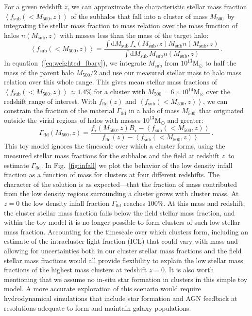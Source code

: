 \documentclass[useAMS,usenatbib,iop,numberedappendix]{mn2e}
\newcommand{\Msun}{\ensuremath{\mathrm{M}_{\odot}}}
\newcommand{\Mfiveoo}{\ensuremath{M_{500}}}
\newcommand{\Mfiveoosub}{\ensuremath{M_{\mathrm{sub}}}}
\newcommand{\redshift}{\ensuremath{z}}
\newcommand{\dif}{\ensuremath{\mathrm{d}}}
\newcommand{\Bstar}{\ensuremath{B_{\star}}}
\newcommand{\fstar}{\ensuremath{f_{\star}}}
\newcommand{\percent}{\ensuremath{\%}}
\begin{document}
For a given redshift \redshift, we can approximate the characteristic stellar mass fraction $\left<f_\mathrm{sub}(<\Mfiveoo,\redshift)\right>$ of the subhalos that fall into a cluster of mass \Mfiveoo\ by integrating the stellar mass fraction to mass relation over the mass function of halos $n({\Mfiveoosub}, \redshift)$ with masses less than the mass of the target halo:
%
\begin{equation}
\label{eq:weighted_fbary}
\left<f_\mathrm{sub}(<\Mfiveoo,\redshift)\right> = \frac{ 
\int\dif {\Mfiveoosub}\, \fstar({\Mfiveoosub}, \redshift) \Mfiveoosub n({\Mfiveoosub}, \redshift) 
}{
\int \dif {\Mfiveoosub}\, \Mfiveoosub n({\Mfiveoosub}, \redshift) 
} \,  .
\end{equation}
%
In equation~(\ref{eq:weighted_fbary}), we integrate ${\Mfiveoosub}$ from $10^{13}\Msun$
to half the mass of the parent halo $\Mfiveoo/2$ and use our measured stellar mass to halo mass relation over this whole range.  This gives mean stellar mass fractions of 
$\left<f_\mathrm{sub}(<\Mfiveoo,\redshift)\right>\approx1.4\percent$ for a cluster with $\Mfiveoo=6\times10^{14}\Msun$ over the redshift range of interest.
With $f_{\mathrm{fld}}(\redshift)$ and $\left<f_\mathrm{sub}(<\Mfiveoo,\redshift)\right>$, we can constrain the fraction of the material  $\Gamma_\mathrm{fld}$ in a halo of mass \Mfiveoo\ that originated outside the virial regions of halos with masses $10^{13}\Msun$ and greater:
%
\begin{equation}
\label{eq:gamma}
\Gamma_{\mathrm{fld}}(\Mfiveoo, \redshift) = \frac{
\fstar(\Mfiveoo, \redshift) \Bstar - \left<f_\mathrm{sub}(<\Mfiveoo,\redshift)\right> 
}
{
f_\mathrm{fld}(\redshift) - \left<f_\mathrm{sub}(<\Mfiveoo,\redshift)\right>
} \,  .
\end{equation}
%
This toy model ignores the timescale over which a cluster forms, using the measured stellar mass fractions for the subhalos and the field at redshift \redshift\ to estimate  $\Gamma_\mathrm{fld}$.     In Fig.~\ref{fig:infall} we plot the behavior of the low density infall fraction as a function of mass for clusters at four different redshifts.   The character of the solution is as expected---that the fraction of mass contributed from the low density regions surrounding a cluster grows with cluster mass.  At $\redshift=0$ the low density infall fraction $\Gamma_{\mathrm{fld}}$ reaches $100\percent$.  At this mass and redshift, the cluster stellar mass fraction falls below the field stellar mass fraction, and within the toy model it is no longer possible to form clusters of such low stellar mass fraction.  Accounting for the timescale over which clusters form, including an estimate of the intracluster light fraction (ICL) that could vary with mass and allowing for uncertainties both in our cluster stellar mass fractions and the field stellar mass fractions would all provide flexibility to explain the low stellar mass fractions of the highest mass clusters at redshift $\redshift=0$.  
It is also worth mentioning that we assume no in-situ star formation in clusters in this simple toy model.
A more accurate exploration of this scenario would require hydrodynamical simulations that include star formation and AGN feedback at resolutions adequate to form and maintain galaxy populations.
\end{document}
